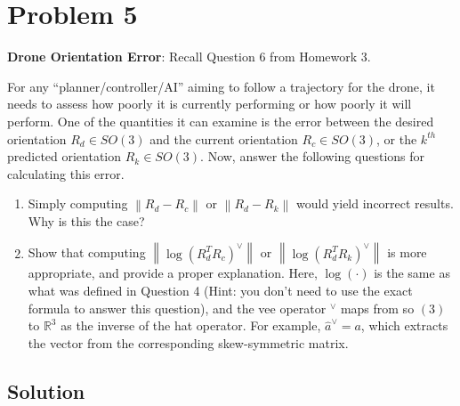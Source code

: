 \section*{Problem 5}

\textbf{Drone Orientation Error}:
Recall Question 6 from Homework 3.

For any ``planner/controller/AI'' aiming to follow a trajectory for the drone, it needs to assess how poorly it is currently performing or how poorly it will perform.
One of the quantities it can examine is the error between the desired orientation \( R_{d} \in SO(3) \) and the current orientation \( R_{c} \in SO(3) \), or the \( k^{th} \) predicted orientation \( R_{k} \in SO(3) \).
Now, answer the following questions for calculating this error.
\begin{enumerate}[label= (\alph*)]
    \item Simply computing \( \left \| R_{d}-R_{c}\right \| \) or \( \left \| R_{d}-R_{k}\right \| \) would yield incorrect results.
          Why is this the case?
    \item  Show that computing \( \left \| \log {\left(R_{d}^{T} R_{c}\right)}^{\vee}\right \| \) or \( \left \| \log {\left(R_{d}^{T} R_{k}\right)}^{\vee}\right \| \) is more appropriate, and provide a proper explanation.
          Here, \( \log (\cdot) \) is the same as what was defined in Question 4 (Hint: you don't need to use the exact formula to answer this question), and the vee operator \( { }^{\vee} \) maps from so \( (3) \) to \( \mathbb{R}^{3} \) as the inverse of the hat operator.
          For example, \( \hat{a}^{\vee}=a \), which extracts the vector from the corresponding skew-symmetric matrix.
\end{enumerate}

\subsection*{Solution}
